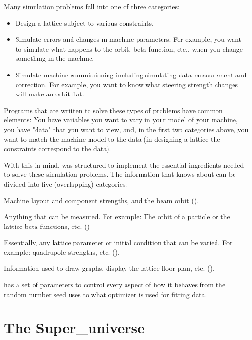Many simulation problems fall into one of three categories: 
\begin{itemize}
\item 
Design a lattice subject to various constraints.
\item
Simulate errors and changes in machine parameters. For example, you want to simulate what happens to
the orbit, beta function, etc., when you change something in the machine.
\item 
Simulate machine commissioning including simulating data measurement and correction. For example,
you want to know what steering strength changes will make an orbit flat.
\end{itemize}
Programs that are written to solve these types of problems have common elements: You have variables
you want to vary in your model of your machine, you have "data" that you want to view, and, in the
first two categories above, you want to match the machine model to the data (in designing a lattice
the constraints correspond to the data).

With this in mind, \tao was structured to implement the essential ingredients needed to solve these
simulation problems.  The information that \tao knows about can be divided into five (overlapping)
categories:
\begin{description}
  \item[Lattice] \Newline   
Machine layout and component strengths, and the beam orbit ().
  \item[Data] \Newline
Anything that can be measured.
For example: The orbit of a particle or the lattice beta 
functions, etc. ()
  \item[Variables] \Newline
Essentially, any lattice parameter or initial condition that can be varied. For example: quadrupole
strengths, etc. ().
  \item[Plotting]  \Newline
Information used to draw graphs, display the lattice 
floor plan, etc. ().
  \item[Global Parameters] \Newline
 \tao has a set of parameters to control every aspect of how it behaves from
the random number seed \tao uses to what optimizer is used for fitting data.
\end{description}

\section{The Super\_universe}
\label{s:super.uni}

